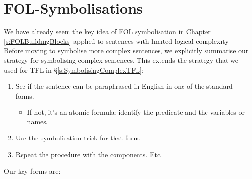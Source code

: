 %
%
%


\chapter{FOL-Symbolisations}
\label{s:SymbolisingComplexFOL}
We have already seem the key idea of FOL symbolisation in Chapter \ref{s:FOLBuildingBlocks} applied to sentences with limited logical complexity. Before moving to symbolise more complex sentences, we explicitly summarise our strategy for symbolising complex sentences. This extends the strategy that we used for TFL in \S\ref{s:SymbolisingComplexTFL}:

\begin{highlighted}
\begin{enumerate}
\item See if the sentence can be paraphrased in English in one of the standard forms.
	\begin{itemize}
	\item If not, it's an atomic formula: identify the predicate and the variables or names.
	\end{itemize}
\item Use the symbolisation trick for that form.
\item Repeat the procedure with the components. Etc.
\end{enumerate}
\end{highlighted}

Our key forms are:

